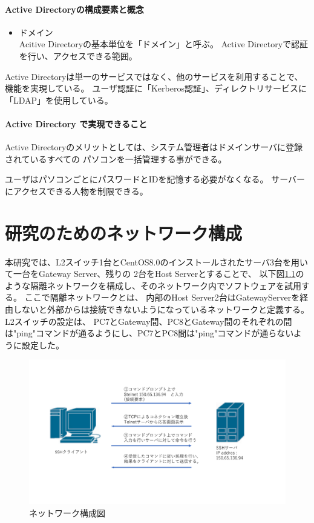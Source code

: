 \documentclass[11pt,a4j,titlepage]{jreport}
\begin{document}

\subsubsection*{Active Directoryの構成要素と概念}

\begin{itemize}
    \item ドメイン\mbox{}\\
    Acitive Directoryの基本単位を「ドメイン」と呼ぶ。
    Active Directoryで認証を行い、アクセスできる範囲。

\end{itemize}
Active Directoryは単一のサービスではなく、他のサービスを利用することで、機能を実現している。
ユーザ認証に「Kerberos認証」、ディレクトリサービスに「LDAP」を使用している。


\subsubsection*{Active Directory で実現できること}
Active Directoryのメリットとしては、システム管理者はドメインサーバに登録されているすべての
パソコンを一括管理する事ができる。

ユーザはパソコンごとにパスワードとIDを記憶する必要がなくなる。
サーバーにアクセスできる人物を制限できる。


\fi


\chapter{研究のためのネットワーク構成}
本研究では、L2スイッチ1台とCentOS8.0のインストールされたサーバ3台を用いて一台をGateway Server、残りの
2台をHost Serverとすることで、
以下図\ref{network_graph}のような隔離ネットワークを構成し、そのネットワーク内でソフトウェアを試用する。
ここで隔離ネットワークとは、
内部のHost Server2台はGatewayServerを経由しないと外部からは接続できないようになっているネットワークと定義する。
L2スイッチの設定は、
PC7とGateway間、PC8とGateway間のそれぞれの間は"ping"コマンドが通るようにし、PC7とPC8間は"ping"コマンドが通らないように設定した。

\begin{figure}[H]
    \centering
    \includegraphics*[width=1.0\textwidth,page=2]{graphs/network_archtecture.pdf}
    \caption{ネットワーク構成図}
    \label{network_graph}
\end{figure}
\end{document}
